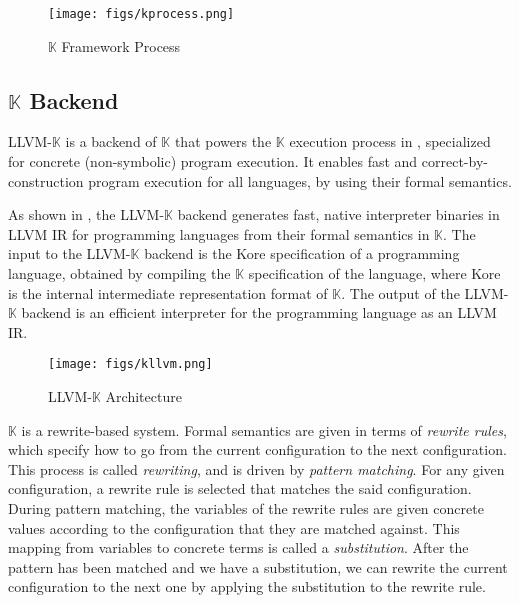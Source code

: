 \documentclass{article}
\newcommand{\K}{\ensuremath{\mathbb{K}}\xspace}
\begin{document}
\begin{figure}
\centering
\texttt{[image: figs/kprocess.png]}
\caption{\K Framework Process}
\label{fig:kprocess}
\end{figure}

\subsection{\K Backend}
\label{sec:kbackend}

LLVM-\K is a backend of \K that powers the \K execution process in ,
specialized for concrete (non-symbolic) program execution.
It enables fast and correct-by-construction program execution for all languages, by
using their formal semantics.

As shown in ,
the LLVM-\K backend generates fast, native interpreter binaries in LLVM IR for programming languages
from their formal semantics in \K.
The input to the LLVM-\K backend
is the Kore specification of a programming language, obtained by compiling the
\K specification of the language,
where Kore is the internal intermediate representation format of \K.
The output of the LLVM-\K backend is an efficient interpreter for the programming language
as an LLVM IR.

\begin{figure}
\centering
\texttt{[image: figs/kllvm.png]}
\caption{LLVM-\K Architecture}
\label{fig:kllvm}
\end{figure}

\K is a rewrite-based system.
Formal semantics are given in terms of \emph{rewrite rules}, which specify how to go from
the current configuration to the next configuration.
This process is called \emph{rewriting}, and is driven by \emph{pattern matching}.
For any given configuration, a rewrite rule is selected that matches the said configuration.
During pattern matching,
the variables of the rewrite rules are given concrete values
according to the configuration that they are matched against.
This mapping from variables to concrete terms is called a \emph{substitution}.
After the pattern has been matched and we have a substitution,
we can rewrite the current configuration to the next one by
applying the substitution to the rewrite rule.
\end{document}
